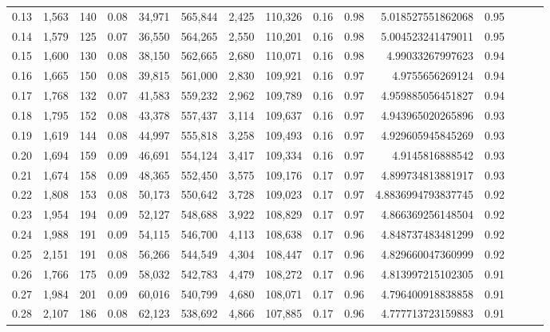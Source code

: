 \begin{tabular}{rrrrrrrrrrrrrrr}
0.13 &   1,563 &    140 &  0.08 &   34,971 &  565,844 &    2,425 &  110,326 &  0.16 &  0.98 &    5.018527551862068 &      0.95 \\
0.14 &   1,579 &    125 &  0.07 &   36,550 &  564,265 &    2,550 &  110,201 &  0.16 &  0.98 &    5.004523241479011 &      0.95 \\
0.15 &   1,600 &    130 &  0.08 &   38,150 &  562,665 &    2,680 &  110,071 &  0.16 &  0.98 &     4.99033267997623 &      0.94 \\
0.16 &   1,665 &    150 &  0.08 &   39,815 &  561,000 &    2,830 &  109,921 &  0.16 &  0.97 &      4.9755656269124 &      0.94 \\
0.17 &   1,768 &    132 &  0.07 &   41,583 &  559,232 &    2,962 &  109,789 &  0.16 &  0.97 &    4.959885056451827 &      0.94 \\
0.18 &   1,795 &    152 &  0.08 &   43,378 &  557,437 &    3,114 &  109,637 &  0.16 &  0.97 &    4.943965020265896 &      0.93 \\
0.19 &   1,619 &    144 &  0.08 &   44,997 &  555,818 &    3,258 &  109,493 &  0.16 &  0.97 &    4.929605945845269 &      0.93 \\
0.20 &   1,694 &    159 &  0.09 &   46,691 &  554,124 &    3,417 &  109,334 &  0.16 &  0.97 &      4.9145816888542 &      0.93 \\
0.21 &   1,674 &    158 &  0.09 &   48,365 &  552,450 &    3,575 &  109,176 &  0.17 &  0.97 &    4.899734813881917 &      0.93 \\
0.22 &   1,808 &    153 &  0.08 &   50,173 &  550,642 &    3,728 &  109,023 &  0.17 &  0.97 &   4.8836994793837745 &      0.92 \\
0.23 &   1,954 &    194 &  0.09 &   52,127 &  548,688 &    3,922 &  108,829 &  0.17 &  0.97 &    4.866369256148504 &      0.92 \\
0.24 &   1,988 &    191 &  0.09 &   54,115 &  546,700 &    4,113 &  108,638 &  0.17 &  0.96 &    4.848737483481299 &      0.92 \\
0.25 &   2,151 &    191 &  0.08 &   56,266 &  544,549 &    4,304 &  108,447 &  0.17 &  0.96 &    4.829660047360999 &      0.92 \\
0.26 &   1,766 &    175 &  0.09 &   58,032 &  542,783 &    4,479 &  108,272 &  0.17 &  0.96 &    4.813997215102305 &      0.91 \\
0.27 &   1,984 &    201 &  0.09 &   60,016 &  540,799 &    4,680 &  108,071 &  0.17 &  0.96 &    4.796400918838858 &      0.91 \\
0.28 &   2,107 &    186 &  0.08 &   62,123 &  538,692 &    4,866 &  107,885 &  0.17 &  0.96 &    4.777713723159883 &      0.91 \\

\end{tabular}
